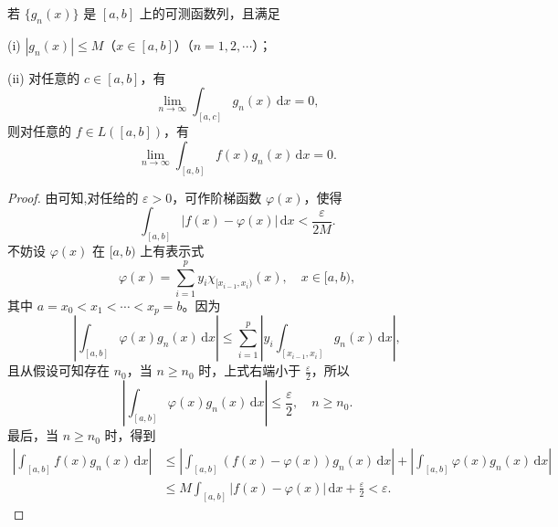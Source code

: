 \documentclass[../../main.tex]{subfiles}%
\begin{document}
\begin{theorem}\label{theorem:Riemann-Lebesgue引理的推广}
若 \( \{g_n(x)\} \) 是 \([a,b]\) 上的可测函数列，且满足

(i) \( |g_n(x)| \leqslant M \)（\( x \in [a,b] \)）（\( n = 1,2,\cdots \)）；

(ii) 对任意的 \( c \in [a,b] \)，有
\[
\lim_{n \to \infty} \int_{[a,c]} g_n(x) \, \mathrm{d}x = 0,
\]
则对任意的 \( f \in L([a,b]) \)，有
\[
\lim_{n \to \infty} \int_{[a,b]} f(x) g_n(x) \, \mathrm{d}x = 0.
\]
\end{theorem}
\begin{proof}
由可知,对任给的 \( \varepsilon > 0 \)，可作阶梯函数 \( \varphi(x) \)，使得
\[
\int_{[a,b]} |f(x) - \varphi(x)| \, \mathrm{d}x < \frac{\varepsilon}{2M}.
\]
不妨设 \( \varphi(x) \) 在 \([a,b)\) 上有表示式
\[
\varphi(x) = \sum_{i=1}^p y_i \chi_{[x_{i-1},x_i)}(x), \quad x \in [a,b),
\]
其中 \( a = x_0 < x_1 < \cdots < x_p = b \)。因为
\[
\left| \int_{[a,b]} \varphi(x) g_n(x) \, \mathrm{d}x \right| \leqslant \sum_{i=1}^p \left| y_i \int_{[x_{i-1},x_i]} g_n(x) \, \mathrm{d}x \right|,
\]
且从假设可知存在 \( n_0 \)，当 \( n \geqslant n_0 \) 时，上式右端小于 \(\frac{ \varepsilon}{2} \)，所以
\[
\left| \int_{[a,b]} \varphi(x) g_n(x) \, \mathrm{d}x \right| \leqslant \frac{\varepsilon}{2}, \quad n \geqslant n_0.
\]
最后，当 \( n \geqslant n_0 \) 时，得到
\begin{align*}
\left| \int_{[a,b]} f(x) g_n(x) \, \mathrm{d}x \right| &\leqslant \left| \int_{[a,b]} (f(x) - \varphi(x)) g_n(x) \, \mathrm{d}x \right| + \left| \int_{[a,b]} \varphi(x) g_n(x) \, \mathrm{d}x \right| \\
&\leqslant M \int_{[a,b]} |f(x) - \varphi(x)| \, \mathrm{d}x + \frac{\varepsilon}{2} < \varepsilon.
\end{align*}
\end{proof}
\end{document}
